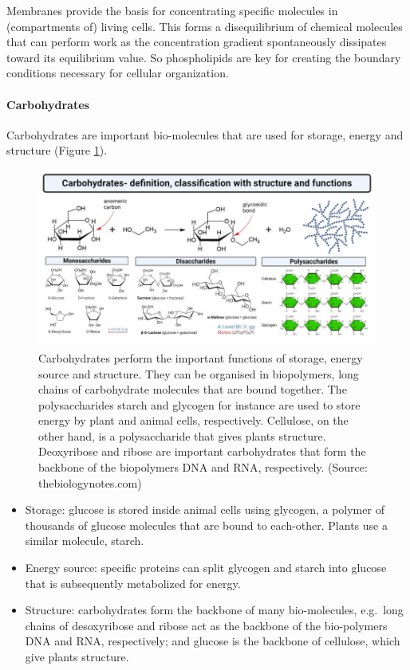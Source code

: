 \documentclass[
  11pt,
]{book}
\providecommand{\tightlist}{%
  \setlength{\itemsep}{0pt}\setlength{\parskip}{0pt}}
\begin{document}
Membranes provide the basis for concentrating specific molecules in (compartments of) living cells. This forms a disequilibrium of chemical molecules that can perform work as the concentration gradient spontaneously dissipates toward its equilibrium value. So phospholipids are key for creating the boundary conditions necessary for cellular organization.

\hypertarget{carbohydrates}{%
\paragraph{Carbohydrates}\label{carbohydrates}}

Carbohydrates are important bio-molecules that are used for storage, energy and structure (Figure \ref{fig:carbohydrates}).

\begin{figure}

{\centering \includegraphics[width=1\linewidth]{./figs/Carbohydrates-definition-classification-with-structure-and-functions} 

}

\caption{Carbohydrates perform the important functions of storage, energy source and structure. They can be organised in biopolymers, long chains of carbohydrate molecules that are bound together. The polysaccharides starch and glycogen for instance are used to store energy by plant and animal cells, respectively. Cellulose, on the other hand, is a polysaccharide that gives plants structure. Deoxyribose and ribose are important carbohydrates that form the backbone of the biopolymers DNA and RNA, respectively. (Source: thebiologynotes.com)}\label{fig:carbohydrates}
\end{figure}

\begin{itemize}
\tightlist
\item
  Storage: glucose is stored inside animal cells using glycogen, a polymer of thousands of glucose molecules that are bound to each-other. Plants use a similar molecule, starch.
\item
  Energy source: specific proteins can split glycogen and starch into glucose that is subsequently metabolized for energy.
\item
  Structure: carbohydrates form the backbone of many bio-molecules, e.g.~long chains of desoxyribose and ribose act as the backbone of the bio-polymers DNA and RNA, respectively; and glucose is the backbone of cellulose, which give plants structure.
\end{itemize}
\end{document}
